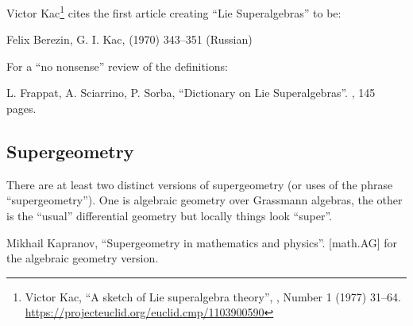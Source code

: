 Victor Kac\footnote{Victor Kac, ``A sketch of Lie superalgebra theory'',  , Number 1 (1977) 31--64. \url{https://projecteuclid.org/euclid.cmp/1103900590}} cites the first article
creating ``Lie Superalgebras'' to be:

\begin{enumerate}[resume,label={[\arabic*]}]
\item Felix Berezin, G. I. Kac,   (1970) 343--351 (Russian)
\end{enumerate}
For a ``no nonsense'' review of the definitions:
\begin{enumerate}[resume,label={[\arabic*]}]
\item L. Frappat, A. Sciarrino, P. Sorba,
  ``Dictionary on Lie Superalgebras''.\newline
  , 145 pages.
\end{enumerate}

\subsection{Supergeometry}

There are at least two distinct versions of supergeometry (or uses of
the phrase ``supergeometry''). One is algebraic geometry over Grassmann
algebras, the other is the ``usual'' differential geometry but locally
things look ``super''.

\begin{enumerate}[resume,label={[\arabic*]}]
\item Mikhail Kapranov, ``Supergeometry in mathematics and physics''.\newline
{} [math.AG] for the algebraic geometry version.
\end{enumerate}


